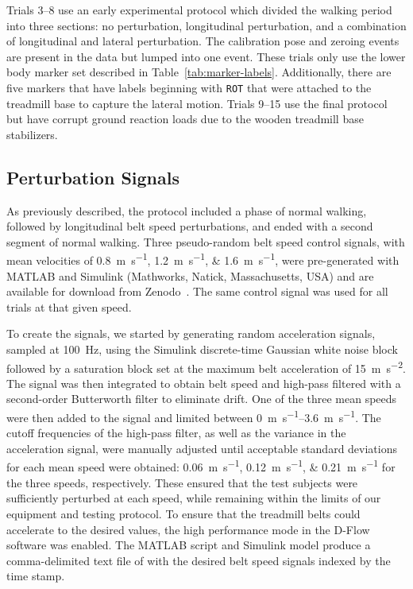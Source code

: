 \documentclass[fleqn,12pt]{wlpeerj}
\begin{document}
Trials 3--8 use an early experimental protocol which divided the walking period
into three sections: no perturbation, longitudinal perturbation, and a
combination of longitudinal and lateral perturbation. The calibration pose and
zeroing events are present in the data but lumped into one event. These trials
only use the lower body marker set described in Table~\ref{tab:marker-labels}.
Additionally, there are five markers that have labels beginning with \verb|ROT|
that were attached to the treadmill base to capture the lateral motion. Trials
9--15 use the final protocol but have corrupt ground reaction loads due to the
wooden treadmill base stabilizers.

\subsection*{Perturbation Signals}
%
As previously described, the protocol included a phase of normal walking,
followed by longitudinal belt speed perturbations, and ended with a second
segment of normal walking. Three pseudo-random belt speed control signals, with
mean velocities of \SIlist{0.8;1.2;1.6}{\meter\per\second}, were pre-generated
with MATLAB and Simulink (Mathworks, Natick, Massachusetts, USA) and are
available for download from Zenodo~\citep{Hnat2015}. The same control signal
was used for all trials at that given speed.

To create the signals, we started by generating random acceleration signals,
sampled at 100~\si{\hertz}, using the Simulink discrete-time Gaussian white
noise block followed by a saturation block set at the maximum belt acceleration
of 15~\si{\meter\per\second\squared}. The signal was then integrated to obtain
belt speed and high-pass filtered with a second-order Butterworth filter to
eliminate drift. One of the three mean speeds were then added to the signal and
limited between \SIrange{0}{3.6}{\meter\per\second}. The cutoff frequencies of
the high-pass filter, as well as the variance in the acceleration signal, were
manually adjusted until acceptable standard deviations for each mean speed were
obtained: \SIlist{0.06;0.12;0.21}{\meter\per\second} for the three speeds,
respectively. These ensured that the test subjects were sufficiently perturbed
at each speed, while remaining within the limits of our equipment and testing
protocol. To ensure that the treadmill belts could accelerate to the desired
values, the high performance mode in the D-Flow software was enabled. The
MATLAB script and Simulink model produce a comma-delimited text file of with
the desired belt speed signals indexed by the time stamp.
\end{document}
